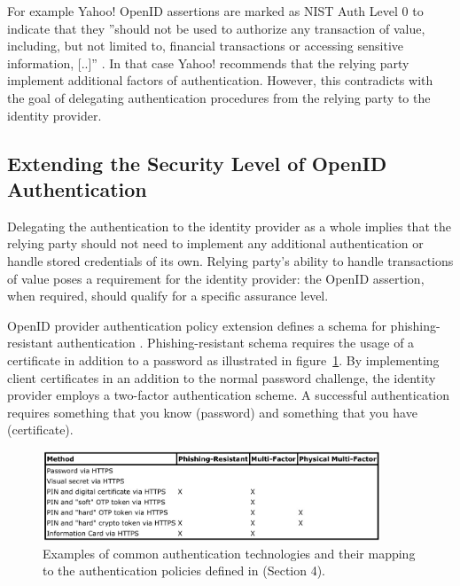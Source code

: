 \documentclass[english,gradu]{tktltiki}
\begin{document}
   For example Yahoo! OpenID assertions are marked as NIST Auth Level 0 to indicate that they ''should not be used to authorize any transaction of value, including, but not limited to, financial transactions or accessing sensitive information, [..]'' \cite{yahoo_openid_bestpractices_2010}. In that case Yahoo! recommends that the relying party implement additional factors of authentication. However, this contradicts with the goal of delegating authentication procedures from the relying party to the identity provider.



\subsection{Extending the Security Level of OpenID Authentication}

    Delegating the authentication to the identity provider as a whole implies that the relying party should not need to implement any additional authentication or handle stored credentials of its own. Relying party's ability to handle transactions of value poses a requirement for the identity provider: the OpenID assertion, when required, should qualify for a specific assurance level.

    OpenID provider authentication policy extension defines a schema for phishing-resistant authentication \cite{openid_2.0_pape_07}. Phishing-resistant schema requires the usage of a certificate in addition to a password as illustrated in figure~\ref{fig:openid_policy_examples}. By implementing client certificates in an addition to the normal password challenge, the identity provider employs a two-factor authentication scheme. A successful authentication requires something that you know (password) and something that you have (certificate).



\begin{figure}
  \centering
  \includegraphics[width=0.9\textwidth]{images/openid_authentication_policy_examples.jpg}
  \caption{Examples of common authentication technologies and their mapping to the authentication policies defined in \cite{openid_2.0_pape_07} (Section 4).}
  \label{fig:openid_policy_examples}
\end{figure}
\end{document}
